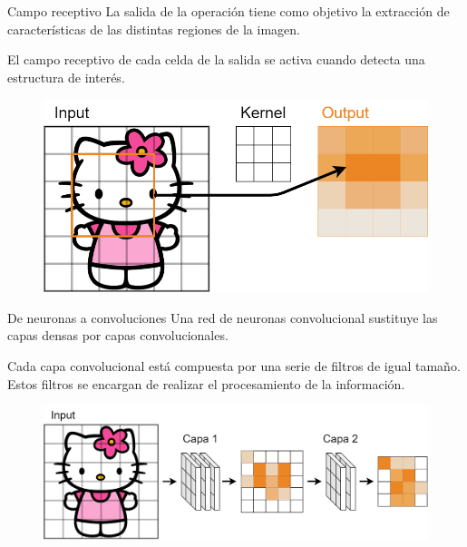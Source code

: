 \begin{frame}{Campo receptivo}
La salida de la \alert{operación} tiene como objetivo la \alert{extracción de características} de las distintas \alert{regiones de la imagen}.

El \alert{campo receptivo} de cada celda de la salida se \alert{activa} cuando detecta una \alert{estructura de interés}.

\begin{figure}
    \centering
    \includegraphics[width=\textwidth]{figures/Tema 3/ReceptiveActivation_1.png}
\end{figure}
\end{frame}

\begin{frame}{De neuronas a convoluciones}
Una \alert{red de neuronas} convolucional sustituye las capas \alert{densas} por capas \alert{convolucionales}.

Cada capa convolucional está compuesta por una \alert{serie} de \alert{filtros} de igual tamaño. Estos filtros se encargan de realizar el procesamiento de la información.

\begin{figure}
    \centering
    \includegraphics[width=\textwidth]{figures/Tema 3/CNN_Net.png}
\end{figure}
\end{frame}

